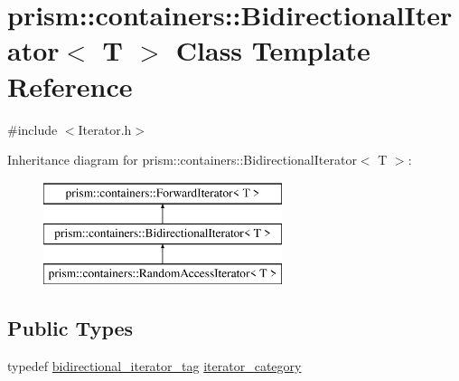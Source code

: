 \hypertarget{classprism_1_1containers_1_1_bidirectional_iterator}{}\section{prism\+:\+:containers\+:\+:Bidirectional\+Iterator$<$ T $>$ Class Template Reference}
\label{classprism_1_1containers_1_1_bidirectional_iterator}


{\ttfamily \#include $<$Iterator.\+h$>$}

Inheritance diagram for prism\+:\+:containers\+:\+:Bidirectional\+Iterator$<$ T $>$\+:\begin{figure}[H]
\begin{center}
\leavevmode
\includegraphics[height=3.000000cm]{classprism_1_1containers_1_1_bidirectional_iterator}
\end{center}
\end{figure}
\subsection*{Public Types}
\begin{DoxyCompactItemize}
\item 
typedef \hyperlink{structprism_1_1containers_1_1bidirectional__iterator__tag}{bidirectional\+\_\+iterator\+\_\+tag} \hyperlink{classprism_1_1containers_1_1_bidirectional_iterator_a45138f8a3401db5537997b4da7632b2b}{iterator\+\_\+category}
\end{DoxyCompactItemize}
